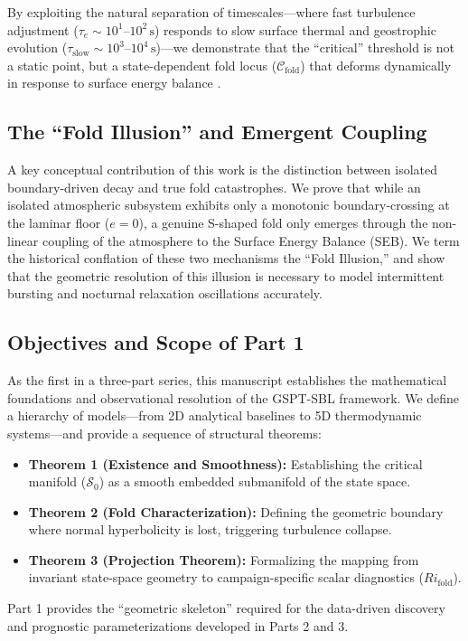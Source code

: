 By exploiting the natural separation of timescales---where fast turbulence adjustment ($\tau_e \sim 10^1\text{--}10^2\,\text{s}$) responds to slow surface thermal and geostrophic evolution ($\tau_{\text{slow}} \sim 10^3\text{--}10^4\,\text{s}$)---we demonstrate that the ``critical'' threshold is not a static point, but a state-dependent fold locus ($\mathcal{C}_{\text{fold}}$) that deforms dynamically in response to surface energy balance \citep{VanDeWiel2012}.

\subsection{The ``Fold Illusion'' and Emergent Coupling}

A key conceptual contribution of this work is the distinction between isolated boundary-driven decay and true fold catastrophes. We prove that while an isolated atmospheric subsystem exhibits only a monotonic boundary-crossing at the laminar floor ($e = 0$), a genuine S-shaped fold only emerges through the non-linear coupling of the atmosphere to the Surface Energy Balance (SEB). We term the historical conflation of these two mechanisms the ``Fold Illusion,'' and show that the geometric resolution of this illusion is necessary to model intermittent bursting and nocturnal relaxation oscillations accurately.

\subsection{Objectives and Scope of Part 1}

As the first in a three-part series, this manuscript establishes the mathematical foundations and observational resolution of the GSPT-SBL framework. We define a hierarchy of models---from 2D analytical baselines to 5D thermodynamic systems---and provide a sequence of structural theorems:
\begin{itemize}
    \item \textbf{Theorem 1 (Existence and Smoothness):} Establishing the critical manifold ($\mathcal{S}_0$) as a smooth embedded submanifold of the state space.
    \item \textbf{Theorem 2 (Fold Characterization):} Defining the geometric boundary where normal hyperbolicity is lost, triggering turbulence collapse.
    \item \textbf{Theorem 3 (Projection Theorem):} Formalizing the mapping from invariant state-space geometry to campaign-specific scalar diagnostics ($Ri_{\text{fold}}$).
\end{itemize}

Part 1 provides the ``geometric skeleton'' required for the data-driven discovery and prognostic parameterizations developed in Parts 2 and 3.